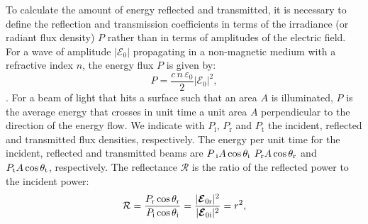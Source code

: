 \indent To calculate the amount of energy reflected and transmitted, it is necessary to define the reflection and transmission coefficients in terms of the irradiance (or radiant flux density) $P$ rather than in terms of amplitudes of the electric field. For a wave of amplitude $|\boldsymbol{\mathcal{E}}_0|$ propagating in a non-magnetic medium with a refractive index $n$, the energy flux $P$ is given by:
\begin{equation}
P = \frac{c\, n \, \varepsilon_0}{2}|\boldsymbol{\mathcal{E}}_0|^2,
\end{equation}
\cite{hecht1998hecht}. For a beam of light that hits a surface such that an area $A$ is illuminated,
$P$ is the average energy that crosses in unit time a unit area $A$ perpendicular to the direction of the energy flow.
We indicate with $P_{\textrm{i}}$, $P_{\textrm{r}}$ and $P_{\textrm{t}}$ the incident, reflected and transmitted flux densities, respectively.
The energy per unit time for the incident, reflected and transmitted beams are 
$P_\textrm{
i} A\cos\theta_\textrm{i}$ $P_\textrm{r} A\cos\theta_\textrm{r}$ and 
$P_\textrm{t} A\cos\theta_\textrm{t}$, respectively. %
The reflectance $\mathcal{R}$ is the ratio of the reflected power to the incident power:
\begin{equation}\label{reflectance}
\mathcal{R} = \frac{P_\textrm{r}\cos\theta_\textrm{r}}{P_\textrm{i}\cos\theta_\textrm{i}} = \frac{|\boldsymbol{\mathcal{E}}_{0 \textrm{r}}|^2}{|\boldsymbol{\mathcal{E}}_{0 \textrm{i}}|^2} = r^2,
\end{equation}
